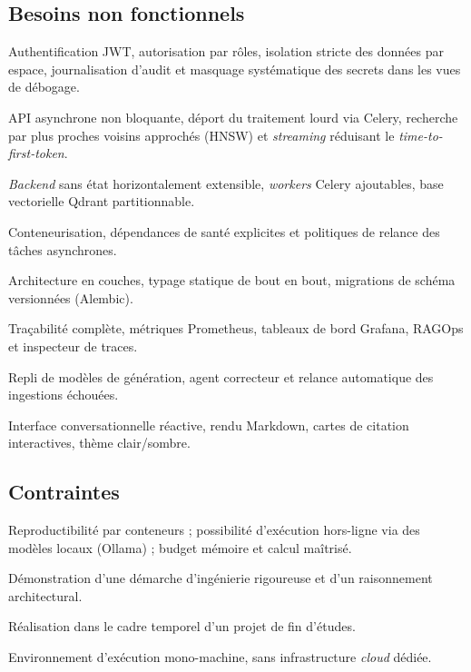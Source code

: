 \subsection{Besoins non fonctionnels}
\begin{description}[leftmargin=2.4cm,style=nextline]
\item[Sécurité] Authentification JWT, autorisation par rôles, isolation stricte
des données par espace, journalisation d'audit et masquage systématique des
secrets dans les vues de débogage.
\item[Performance] API asynchrone non bloquante, déport du traitement lourd via
Celery, recherche par plus proches voisins approchés (HNSW) et \emph{streaming}
réduisant le \emph{time-to-first-token}.
\item[Scalabilité] \textit{Backend} sans état horizontalement extensible,
\emph{workers} Celery ajoutables, base vectorielle Qdrant partitionnable.
\item[Disponibilité] Conteneurisation, dépendances de santé explicites et
politiques de relance des tâches asynchrones.
\item[Maintenabilité] Architecture en couches, typage statique de bout en bout,
migrations de schéma versionnées (Alembic).
\item[Observabilité] Traçabilité complète, métriques Prometheus, tableaux de bord
Grafana, RAGOps et inspecteur de traces.
\item[Fiabilité] Repli de modèles de génération, agent correcteur et relance
automatique des ingestions échouées.
\item[Utilisabilité] Interface conversationnelle réactive, rendu Markdown, cartes
de citation interactives, thème clair/sombre.
\end{description}

\subsection{Contraintes}
\begin{description}[leftmargin=2.4cm,style=nextline]
\item[Techniques] Reproductibilité par conteneurs ; possibilité d'exécution
hors-ligne via des modèles locaux (Ollama) ; budget mémoire et calcul maîtrisé.
\item[Académiques] Démonstration d'une démarche d'ingénierie rigoureuse et d'un
raisonnement architectural.
\item[Temps] Réalisation dans le cadre temporel d'un projet de fin d'études.
\item[Ressources] Environnement d'exécution mono-machine, sans infrastructure
\emph{cloud} dédiée.
\end{description}

